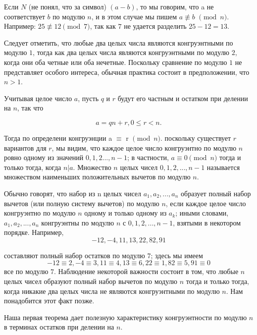 \documentclass[11pt]{article}
\begin{document}
		
	
	Если $N$ (не понял, что за символ) $(a-b)$, то мы говорим, что a не соответствует $b$ по модулю $n$, и в этом случае мы пишем $a \not\equiv b$ $\pmod{n}$. Например: $25 \not\equiv 12 \pmod{7}$, так как $7$ не удается разделить $25-12 = 13$.
	
	Следует отметить, что любые два целых числа являются конгруэнтными по модулю $1$, тогда как два целых числа являются конгруэнтными по модулю $2$, когда они оба четные или оба нечетные. Поскольку сравнение по модулю $1$ не представляет особого интереса, обычная практика состоит в предположении, что $n> 1$.
	
	Учитывая целое число $a$, пусть $q$ и $r$ будут его частным и остатком при делении на $n$, так что
	
	\[
		a=qn+r,  0 \leq r<n.
	\]
	
	Тогда по определени конгруэнции a $\equiv$ r $\pmod{n}$. поскольку существует $r$ вариантов для $r$, мы видим, что каждое целое число конгруэнтно по модулю $n$ ровно одному из значений $0,1,2 ..., n-1$; в частности, $a \equiv 0 \pmod{n}$ тогда и только тогда, когда $n | a$. Множество $n$ целых чисел $0, 1, 2, ..., n-1$ называется множеством наименьших положительных вычетов по модулю $n$.
	
	Обычно говорят, что набор из n целых чисел $a_{1}, a_{2}, ..., a_{n}$ образует полный набор вычетов (или полную систему вычетов) по модулю $n$, если каждое целое число конгруэнтно по модулю $n$ одному и только одному из $a_{k}$; иными словами, $a_{1}, a_{2}, ..., a_{n}$ конгруэнтны по модулю $n$ с $0,1,2, ..., n-1$, взятыми в некотором порядке. Например,
	\[
		-12, -4,11,13,22,82,91
	\]
	
	составляют полный набор остатков по модулю $7$; здесь мы имеем
	\[
		-12 \equiv 2, -4 \equiv 3, 11 \equiv 4, 13 \equiv 6, 22 \equiv 1,82 \equiv 5,91 \equiv 0
	\]
	все по модулю $7$. Наблюдение некоторой важности состоит в том, что любые $n$ целых чисел образуют полный набор вычетов по модулю $n$ тогда и только тогда, когда никакие два целых числа не являются конгруэнтными по модулю $n$. Нам понадобится этот факт позже.
	
	Наша первая теорема дает полезную характеристику конгруэнтности по модулю $n$ в терминах остатков при делении на $n$.
\end{document}
